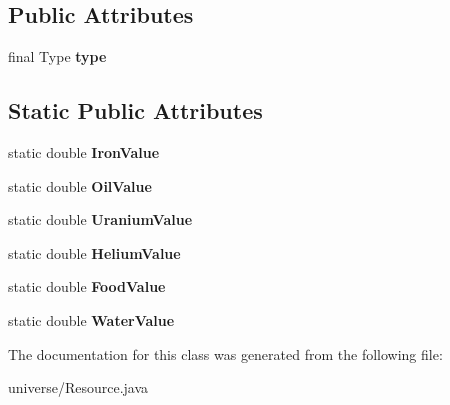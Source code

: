 \subsection*{Public Attributes}
\begin{DoxyCompactItemize}
\item 
final Type {\bfseries type}\hypertarget{classuniverse_1_1_resource_ae725dce2a3db464dd2f951093bf8fbb6}{}\label{classuniverse_1_1_resource_ae725dce2a3db464dd2f951093bf8fbb6}

\end{DoxyCompactItemize}
\subsection*{Static Public Attributes}
\begin{DoxyCompactItemize}
\item 
static double {\bfseries Iron\+Value}\hypertarget{classuniverse_1_1_resource_a950ef55843a4eedef72050ecfc0bd037}{}\label{classuniverse_1_1_resource_a950ef55843a4eedef72050ecfc0bd037}

\item 
static double {\bfseries Oil\+Value}\hypertarget{classuniverse_1_1_resource_aaff463159d8fb910f6840a7f00ce210d}{}\label{classuniverse_1_1_resource_aaff463159d8fb910f6840a7f00ce210d}

\item 
static double {\bfseries Uranium\+Value}\hypertarget{classuniverse_1_1_resource_a2247859c8f184cb7a21b5116bc0eac6c}{}\label{classuniverse_1_1_resource_a2247859c8f184cb7a21b5116bc0eac6c}

\item 
static double {\bfseries Helium\+Value}\hypertarget{classuniverse_1_1_resource_aa03ccc9d0a8fc15a891a5a3af9df9a94}{}\label{classuniverse_1_1_resource_aa03ccc9d0a8fc15a891a5a3af9df9a94}

\item 
static double {\bfseries Food\+Value}\hypertarget{classuniverse_1_1_resource_a9a2f4ca1f94a810da1b8346c6abe5ee3}{}\label{classuniverse_1_1_resource_a9a2f4ca1f94a810da1b8346c6abe5ee3}

\item 
static double {\bfseries Water\+Value}\hypertarget{classuniverse_1_1_resource_aac65305bce15f4e36443daaa8ae724ea}{}\label{classuniverse_1_1_resource_aac65305bce15f4e36443daaa8ae724ea}

\end{DoxyCompactItemize}


The documentation for this class was generated from the following file\+:\begin{DoxyCompactItemize}
\item 
universe/Resource.\+java\end{DoxyCompactItemize}
